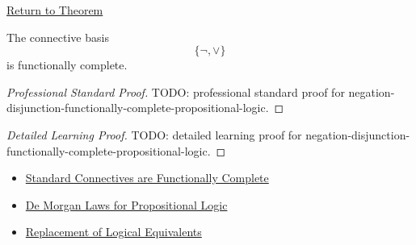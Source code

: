 \newpage
{}
\label{prf:negation-disjunction-functionally-complete-propositional-logic}

\begin{remark*}[Return]
\hyperref[thm:negation-disjunction-functionally-complete-propositional-logic]{Return to Theorem}
\end{remark*}

\begin{theorem*}
The connective basis
\[
\{\neg,\lor\}
\]
is functionally complete.
\end{theorem*}

\begin{proof}[Professional Standard Proof]
\LRAProofBodyStart
TODO: professional standard proof for negation-disjunction-functionally-complete-propositional-logic.
\end{proof}

\begin{proof}[Detailed Learning Proof]
\LRAProofBodyStart
TODO: detailed learning proof for negation-disjunction-functionally-complete-propositional-logic.
\end{proof}

\begin{remark*}
\end{remark*}

\begin{dependencies}
\begin{itemize}
  \item \hyperref[thm:standard-connectives-functionally-complete-propositional-logic]{Standard Connectives are Functionally Complete}
  \item \hyperref[thm:de-morgan-laws-propositional-logic]{De Morgan Laws for Propositional Logic}
  \item \hyperref[thm:replacement-of-logical-equivalents-propositional-logic]{Replacement of Logical Equivalents}
\end{itemize}
\end{dependencies}

\clearpage
